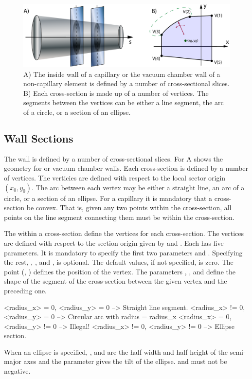 
\begin{figure}[tb]
  \centering
  \includegraphics[width=6in]{chamber-wall.pdf}
  \caption[Capillary or vacuum chamber wall.]
{A) The inside wall of a capillary or the vacuum chamber wall of a
non-capillary element is defined by a number of cross-sectional
slices.  B) Each cross-section is made up of a number of vertices. The
segments between the vertices can be either a line segment, the arc of
a circle, or a section of an ellipse.}
  \label{f:chamber.wall}
\end{figure}

\subsection{Wall Sections}
\label{s:wall.section}

The wall is defined by a number of cross-sectional slices. For
A shows the geometry for  or vacuum
chamber walls.  Each cross-section is defined by a number of
vertices. The verticies are defined with respect to the local sector
origin $(x_0, y_0)$. The arc between each vertex may be either a
straight line, an arc of a circle, or a section of an ellipse. For a
capillary it is mandatory that a cross-section be convex. That is,
given any two points within the cross-section, all points on the line
segment connecting them must be within the cross-section.

The  within a cross-section define the vertices for each
cross-section. The vertices are defined with respect to the section
origin given by  and . Each  has five
parameters. It is mandatory to specify the first two parameters
 and . Specifying the rest, ,
, and , is optional. The default values, if
not specified, is zero. The point (, ) defines the
position of the vertex. The parameters ,
, and  define the shape of the segment of
the cross-section between the given vertex and the preceding one.
\begin{example}
  <radius_x>  = 0, <radius_y>  = 0   --> Straight line segment.
  <radius_x> != 0, <radius_y>  = 0   --> Circular arc with radius = radius_x
  <radius_x>  = 0, <radius_y> != 0   --> Illegal!
  <radius_x> != 0, <radius_y> != 0   --> Ellipse section.
\end{example}
When an ellipse is specified, , and  are
the half width and half height of the semi-major axes and the
 parameter gives the tilt of the ellipse. 
and  must not be negative.

